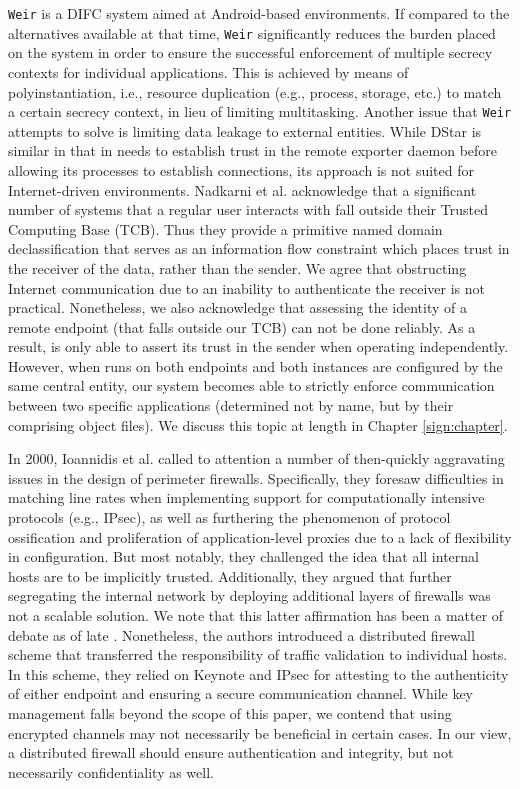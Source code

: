 \texttt{Weir} \cite{nadkarni2016practical} is a DIFC system aimed at Android-based environments. If compared to the alternatives available at that time, \texttt{Weir} significantly reduces the burden placed on the system in order to ensure the successful enforcement of multiple secrecy contexts for individual applications. This is achieved by means of polyinstantiation, i.e., resource duplication (e.g., process, storage, etc.) to match a certain secrecy context, in lieu of limiting multitasking. Another issue that \texttt{Weir} attempts to solve is limiting data leakage to external entities. While DStar is similar in that in needs to establish trust in the remote exporter daemon before allowing its processes to establish connections, its approach is not suited for Internet-driven environments. Nadkarni et al. acknowledge that a significant number of systems that a regular user interacts with fall outside their Trusted Computing Base (TCB). Thus they provide a primitive named domain declassification that serves as an information flow constraint which places trust in the receiver of the data, rather than the sender. We agree that obstructing Internet communication due to an inability to authenticate the receiver is not practical. Nonetheless, we also acknowledge that assessing the identity of a remote endpoint (that falls outside our TCB) can not be done reliably. As a result, \daf{} is only able to assert its trust in the sender when operating independently. However, when \daf{} runs on both endpoints and both instances are configured by the same central entity, our system becomes able to strictly enforce communication between two specific applications (determined not by name, but by their comprising object files). We discuss this topic at length in Chapter \ref{sign:chapter}.

In 2000, Ioannidis et al. \cite{ioannidis2000implementing} called to attention a number of then-quickly aggravating issues in the design of perimeter firewalls. Specifically, they foresaw difficulties in matching line rates when implementing support for computationally intensive protocols (e.g., IPsec), as well as furthering the phenomenon of protocol ossification \cite{turner2005diversifying} and proliferation of application-level proxies due to a lack of flexibility in configuration. But most notably, they challenged the idea that all internal hosts are to be implicitly trusted. Additionally, they argued that further segregating the internal network by deploying additional layers of firewalls was not a scalable solution. We note that this latter affirmation has been a matter of debate as of late \cite{bagheri2020dynamic}. Nonetheless, the authors introduced a distributed firewall scheme that transferred the responsibility of traffic validation to individual hosts. In this scheme, they relied on Keynote and IPsec for attesting to the authenticity of either endpoint and ensuring a secure communication channel. While key management falls beyond the scope of this paper, we contend that using encrypted channels may not necessarily be beneficial in certain cases. In our view, a distributed firewall should ensure authentication and integrity, but not necessarily confidentiality as well.

